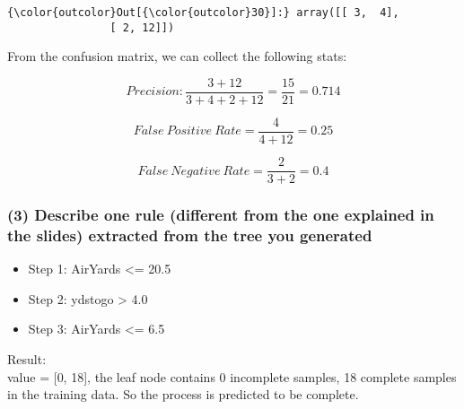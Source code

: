 \documentclass[11pt]{article}
\providecommand{\tightlist}{%
      \setlength{\itemsep}{0pt}\setlength{\parskip}{0pt}}
\begin{document}
\begin{Verbatim}[commandchars=\\\{\}]
{\color{outcolor}Out[{\color{outcolor}30}]:} array([[ 3,  4],
                [ 2, 12]])
\end{Verbatim}
            
    From the confusion matrix, we can collect the following stats:

\[Precision: \frac{3+12}{3+4+2+12} = \frac{15}{21} = 0.714\]

\[False \: Positive \: Rate= \frac{4}{4+12} = 0.25\]

\[False \: Negative \: Rate = \frac{2}{3+2} = 0.4\]

    \subsubsection*{(3) Describe one rule (different from the one explained
in the slides) extracted from the tree you
generated}\label{describe-one-rule-different-from-the-one-explained-in-the-slides-extracted-from-the-tree-you-generated}

    \begin{itemize}
\tightlist
\item
  Step 1: AirYards \textless{}= 20.5
\item
  Step 2: ydstogo \textgreater{} 4.0
\item
  Step 3: AirYards \textless{}= 6.5
\end{itemize}

\noindent Result:\\

\noindent value = {[}0, 18{]}, the leaf node contains 0 incomplete samples, 18
complete samples in the training data. So the process is predicted to be
complete.


    
    
    
    
\end{document}
